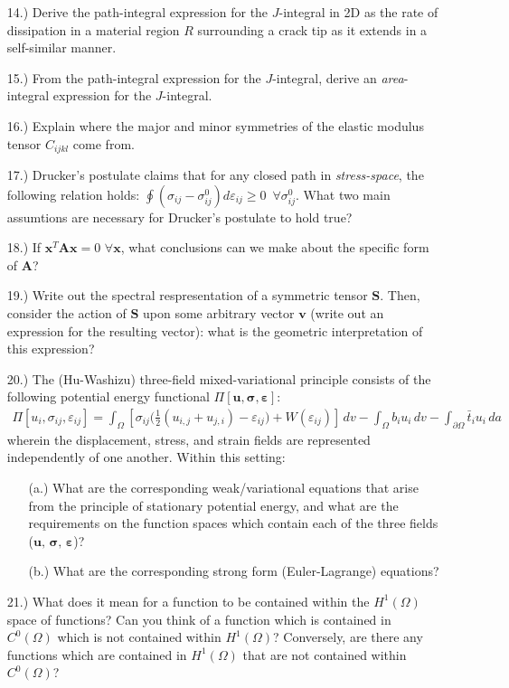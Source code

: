 \documentclass[12pt]{article}
\begin{document}
\begin{itemize}
	\item[14.)] Derive the path-integral expression for the $J$-integral in 2D as the rate of dissipation in a material region $R$ surrounding a crack tip as it extends in a self-similar manner.
	\item[15.)] From the path-integral expression for the $J$-integral, derive an \textit{area}-integral expression for the $J$-integral.
	\item[16.)] Explain where the major and minor symmetries of the elastic modulus tensor $C_{ijkl}$ come from. 
	\item[17.)] Drucker's postulate claims that for any closed path in \textit{stress-space}, the following relation holds: $\oint (\sigma_{ij} - \sigma^0_{ij}) d \varepsilon_{ij} \geq 0 \, \, \, \forall \sigma^0_{ij}$. What two main assumtions are necessary for Drucker's postulate to hold true?
	\item[18.)] If $\mathbf{x}^T \mathbf{A} \mathbf{x} = 0 \, \, \forall \mathbf{x}$, what conclusions can we make about the specific form of $\mathbf{A}$?
	\item[19.)] Write out the spectral respresentation of a symmetric tensor $\mathbf{S}$. Then, consider the action of $\mathbf{S}$ upon some arbitrary vector $\mathbf{v}$ (write out an expression for the resulting vector): what is the geometric interpretation of this expression?
	\item[20.)] The (Hu-Washizu) three-field mixed-variational principle consists of the following potential energy functional $\Pi \left[ \mathbf{u}, \boldsymbol{\sigma}, \boldsymbol{\varepsilon} \right]$:
	\begin{eqnarray}
		\Pi \left[ u_i, \sigma_{ij}, \varepsilon_{ij} \right] = \int_{\Omega} \left[ \sigma_{ij} \bigg( \frac{1}{2} ( u_{i,j} + u_{j,i} ) - \varepsilon_{ij} \bigg) + W ( \varepsilon_{ij} ) \right] \, dv - \int_{\Omega} b_i u_i \, dv - \int_{\partial \Omega} \bar{t}_i u_i \, da \nonumber
	\end{eqnarray}
	wherein the displacement, stress, and strain fields are represented independently of one another. Within this setting:
	\begin{itemize}
		\item[(a.)] What are the corresponding weak/variational equations that arise from the principle of stationary potential energy, and what are the requirements on the function spaces which contain each of the three fields ($\mathbf{u}, \, \boldsymbol{\sigma}, \, \boldsymbol{\varepsilon}$)?
		\item[(b.)] What are the corresponding strong form (Euler-Lagrange) equations?
	\end{itemize}
	\item[21.)] What does it mean for a function to be contained within the $H^1 (\Omega)$ space of functions? Can you think of a function which is contained in $C^0 (\Omega)$ which is not contained within $H^1 (\Omega)$? Conversely, are there any functions which are contained in $H^1 (\Omega)$ that are not contained within $C^0 (\Omega)$?
\end{itemize}
\end{document}
